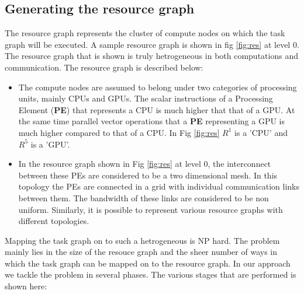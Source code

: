 \subsection{Generating the resource graph}
\label{sec:gener-reso-graph}

The resource graph represents the cluster of compute nodes on which
the task graph will be executed. A sample resource graph is shown in
fig \ref{fig:res} at level 0. The resource graph that is shown is truly
hetrogeneous in both computations and communication. The resource
graph is described below:

\begin{itemize}

\item The compute nodes are assumed to belong under two categories of
processing units, mainly CPUs and GPUs. The scalar instructions of a
Processing Element (\textbf{PE}) that represents a CPU is much higher
that that of a GPU. At the same time parallel vector operations that a
\textbf{PE} representing a GPU is much higher compared to that of a
CPU. In Fig \ref{fig:res} $ R^1 $ is a 'CPU' and $ R^5 $ is a 'GPU'.

\item In the resource graph shown in Fig \ref{fig:res} at level 0, the
interconnect between these PEs are considered to be a two dimensional
mesh. In this topology the PEs are connected in a grid with individual
communication links between them. The bandwidth of these links are
considered to be non uniform. Similarly, it is possible to represent
various resource graphs with different topologies.

\end{itemize}

Mapping the task graph on to such a hetrogeneous is NP hard. The
problem mainly lies in the size of the resouce graph and the sheer
number of ways in which the task graph can be mapped on to the resource
graph. In our approach we tackle the problem in several phases. The
various stages that are performed is shown here:


